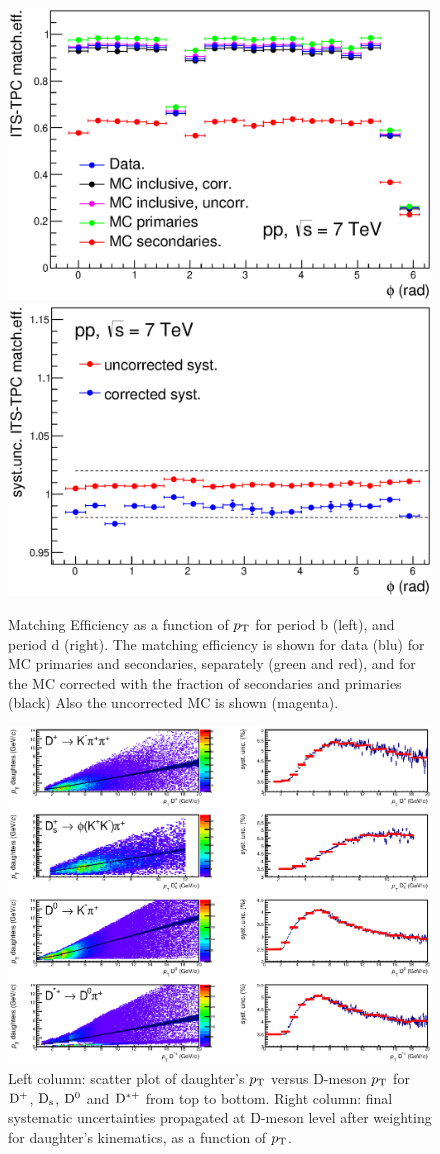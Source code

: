\begin{figure}[!htb]
\begin{center}
\includegraphics[width=.49\textwidth]{FigCap4/ITSTPCmatchEff_10bpass4_vsPhi.eps}
\includegraphics[width=.49\textwidth]{FigCap4/ITSTPCmatchEffSyst_10bpass4_vsPhi.eps}
\caption{Matching Efficiency as a function of $p_{\rm T}$ for period b (left), and period d (right). The matching efficiency is shown for data (blu) for MC primaries and secondaries, separately (green and red), and for the MC corrected with the fraction of secondaries and primaries (black) Also the uncorrected MC is shown (magenta). }
\label{fig:CorrMatchEffVsPhi}
\end{center}
\end{figure}

\begin{figure}[!htb]
\begin{center}
\includegraphics[width=1\textwidth]{FigCap4/FinalSystMEDmesons_ppPass4.eps}
\caption{Left column: scatter plot of daughter's $p_{\rm T}$ versus D-meson $p_{\rm T}$ for ${\rm D^+}$, ${\rm D_s}$, ${\rm D^0}$ and ${\rm D^{*+}}$ from top to bottom. Right column: final systematic uncertainties propagated at D-meson level after weighting for daughter's kinematics, as a function of $p_{\rm T}$.}
\label{fig:SysMatchEffVsPhi}
\end{center}
\end{figure}


